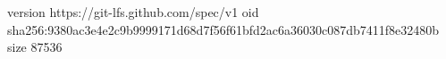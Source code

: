 version https://git-lfs.github.com/spec/v1
oid sha256:9380ac3e4e2c9b9999171d68d7f56f61bfd2ac6a36030c087db7411f8e32480b
size 87536
